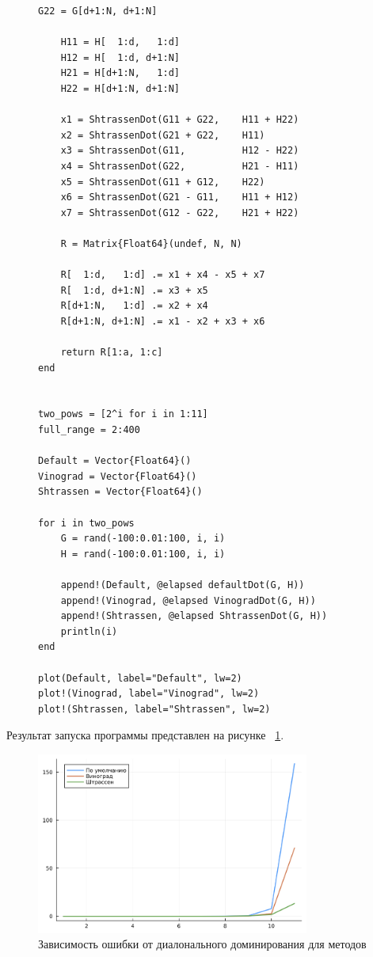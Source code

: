\documentclass[a4paper, 14pt]{extarticle}
\begin{document}
\begin{figure}[!htb]
\begin{lstlisting}[caption={Реализация и сравнение разных вариаций метода Гаусса},label={lst:code1}]
    G22 = G[d+1:N, d+1:N]

    H11 = H[  1:d,   1:d]
    H12 = H[  1:d, d+1:N]
    H21 = H[d+1:N,   1:d]
    H22 = H[d+1:N, d+1:N]
    
    x1 = ShtrassenDot(G11 + G22,    H11 + H22)
    x2 = ShtrassenDot(G21 + G22,    H11)
    x3 = ShtrassenDot(G11,          H12 - H22)
    x4 = ShtrassenDot(G22,          H21 - H11)
    x5 = ShtrassenDot(G11 + G12,    H22)
    x6 = ShtrassenDot(G21 - G11,    H11 + H12)
    x7 = ShtrassenDot(G12 - G22,    H21 + H22)

    R = Matrix{Float64}(undef, N, N)

    R[  1:d,   1:d] .= x1 + x4 - x5 + x7
    R[  1:d, d+1:N] .= x3 + x5
    R[d+1:N,   1:d] .= x2 + x4
    R[d+1:N, d+1:N] .= x1 - x2 + x3 + x6

    return R[1:a, 1:c]
end


two_pows = [2^i for i in 1:11]
full_range = 2:400

Default = Vector{Float64}()
Vinograd = Vector{Float64}()
Shtrassen = Vector{Float64}()

for i in two_pows
    G = rand(-100:0.01:100, i, i)
    H = rand(-100:0.01:100, i, i)

    append!(Default, @elapsed defaultDot(G, H))
    append!(Vinograd, @elapsed VinogradDot(G, H))
    append!(Shtrassen, @elapsed ShtrassenDot(G, H))
    println(i)
end

plot(Default, label="Default", lw=2)
plot!(Vinograd, label="Vinograd", lw=2)
plot!(Shtrassen, label="Shtrassen", lw=2)
\end{lstlisting}
\end{figure}

Результат запуска программы представлен на рисунке ~\ref{fig:img1}.

\begin{figure}[!htb]
	\centering
	\includegraphics[width=0.8\textwidth]{img1}
\caption{Зависимость ошибки от диалонального доминирования для методов}
\label{fig:img1}
\end{figure}
\end{document}
